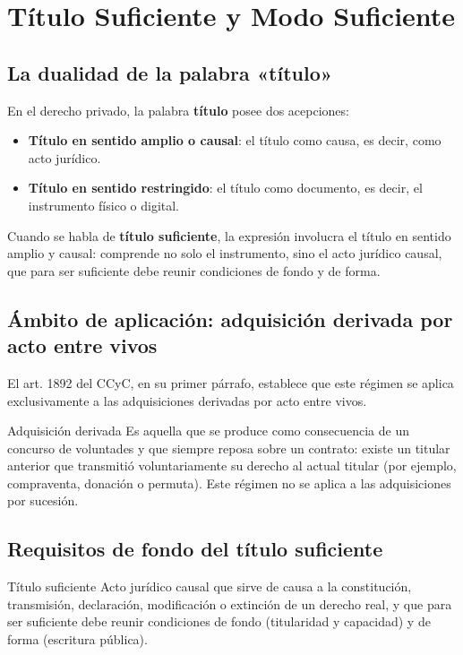 \documentclass[12pt,oneside]{book}
\begin{document}
\chapter{Título Suficiente y Modo Suficiente}

\section{La dualidad de la palabra «título»}

En el derecho privado, la palabra \textbf{título} posee dos acepciones:

\begin{itemize}
\item \textbf{Título en sentido amplio o causal}: el título como causa, es decir, como acto jurídico.
\item \textbf{Título en sentido restringido}: el título como documento, es decir, el instrumento físico o digital.
\end{itemize}

Cuando se habla de \textbf{título suficiente}, la expresión involucra el título en sentido amplio y causal: comprende no solo el instrumento, sino el acto jurídico causal, que para ser suficiente debe reunir condiciones de fondo y de forma.

\section{Ámbito de aplicación: adquisición derivada por acto entre vivos}

El art. 1892 del CCyC, en su primer párrafo, establece que este régimen se aplica exclusivamente a las adquisiciones derivadas por acto entre vivos.

\begin{definition}{Adquisición derivada}
Es aquella que se produce como consecuencia de un concurso de voluntades y que siempre reposa sobre un contrato: existe un titular anterior que transmitió voluntariamente su derecho al actual titular (por ejemplo, compraventa, donación o permuta). Este régimen no se aplica a las adquisiciones por sucesión.
\end{definition}

\section{Requisitos de fondo del título suficiente}

\begin{definition}{Título suficiente}
Acto jurídico causal que sirve de causa a la constitución, transmisión, declaración, modificación o extinción de un derecho real, y que para ser suficiente debe reunir condiciones de fondo (titularidad y capacidad) y de forma (escritura pública).
\end{definition}
\end{document}
